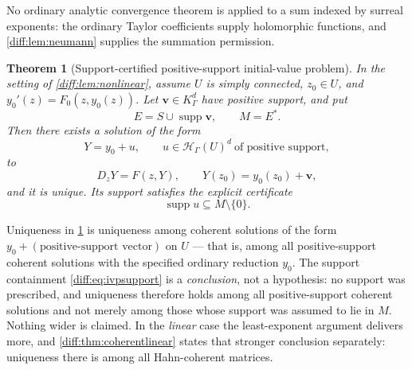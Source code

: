 \documentclass[11pt,letterpaper]{article}
\numberwithin{equation}{section}
\newtheorem{theorem}{Theorem}[section]
\theoremstyle{definition}
\theoremstyle{remark}
\newcommand{\supp}{\operatorname{supp}}
\newcommand{\Hring}{\mathscr H}
\newcommand{\Dz}{D_{z}}
\begin{document}
No ordinary analytic convergence theorem is applied to a sum indexed by
surreal exponents: the ordinary Taylor coefficients supply holomorphic
functions, and \cref{diff:lem:neumann} supplies the summation permission.

\begin{theorem}[Support-certified positive-support initial-value problem]
\label{diff:thm:ivp}
In the setting of \cref{diff:lem:nonlinear}, assume $U$ is simply connected,
$z_{0}\in U$, and $y_{0}'(z)=F_{0}(z,y_{0}(z))$. Let $\mathbf{v}\in K_{\Gamma}^{d}$
have positive support, and put
\[
 E=S\cup\supp\mathbf{v},\qquad M=E^{*}.
\]
Then there exists a solution of the form
\begin{equation}\label{diff:eq:coherentivp}
 Y=y_{0}+u,\qquad u\in\Hring_{\Gamma}(U)^{d}\ \text{of positive support},
\end{equation}
to
\begin{equation}\label{diff:eq:ivp}
 \Dz Y=F(z,Y),\qquad Y(z_{0})=y_{0}(z_{0})+\mathbf{v},
\end{equation}
and it is unique. Its support satisfies the explicit certificate
\begin{equation}\label{diff:eq:ivpsupport}
 \supp u\subseteq M\setminus\{0\}.
\end{equation}
\end{theorem}

\begin{convention}
\label{diff:conv:ivpuniqueness}
Uniqueness in \cref{diff:thm:ivp} is uniqueness among coherent solutions of
the form $y_{0}+(\text{positive-support vector})$ on $U$ --- that is, among all
positive-support coherent solutions with the specified ordinary reduction
$y_{0}$. The support containment \cref{diff:eq:ivpsupport} is a
\emph{conclusion}, not a hypothesis: no support was prescribed, and uniqueness
therefore holds among all positive-support coherent solutions and not merely
among those whose support was assumed to lie in $M$. Nothing wider is claimed.
In the \emph{linear} case the least-exponent argument delivers more, and
\cref{diff:thm:coherentlinear} states that stronger conclusion separately:
uniqueness there is among all Hahn-coherent matrices.
\end{convention}
\end{document}

